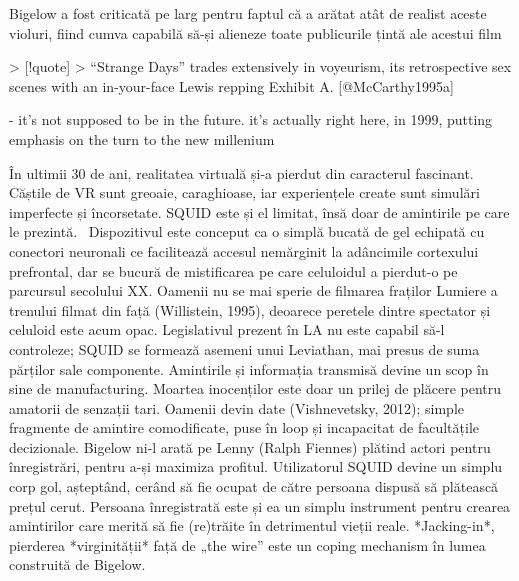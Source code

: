 \documentclass[a4paper, 12pt]{article}
\begin{document}
Bigelow a fost criticată pe larg pentru faptul că a arătat atât de realist aceste violuri, fiind cumva capabilă să-și alieneze toate publicurile țintă ale acestui film

> [!quote]
> “Strange Days” trades extensively in voyeurism, its retrospective sex scenes with an in-your-face Lewis repping Exhibit A. [@McCarthy1995a]



- it's not supposed to be in the future. it's actually right here, in 1999, putting emphasis on the turn to the new millenium

În ultimii 30 de ani, realitatea virtuală și-a pierdut din caracterul fascinant. Căștile de VR sunt greoaie, caraghioase, iar experiențele create sunt simulări imperfecte și încorsetate. SQUID este și el limitat, însă doar de amintirile pe care le prezintă. 
Dispozitivul este conceput ca o simplă bucată de gel echipată cu conectori neuronali ce facilitează accesul nemărginit la adâncimile cortexului prefrontal, dar se bucură de mistificarea pe care celuloidul a pierdut-o pe parcursul secolului XX. Oamenii nu se mai sperie de filmarea fraților Lumiere a trenului filmat din față (Willistein, 1995), deoarece peretele dintre spectator și celuloid este acum opac.
Legislativul prezent în LA nu este capabil să-l controleze; SQUID se formează asemeni unui Leviathan, mai presus de suma părților sale componente.
Amintirile și informația transmisă devine un scop în sine de manufacturing. Moartea inocenților este doar un prilej de plăcere pentru amatorii de senzații tari. Oamenii devin date (Vishnevetsky, 2012); simple fragmente de amintire comodificate, puse în loop și incapacitat de facultățile decizionale. Bigelow ni-l arată pe Lenny (Ralph Fiennes) plătind actori pentru înregistrări, pentru a-și maximiza profitul. Utilizatorul SQUID devine un simplu corp gol, așteptând, cerând să fie ocupat de către persoana dispusă să plătească prețul cerut. Persoana înregistrată este și ea un simplu instrument pentru crearea amintirilor care merită să fie (re)trăite în detrimentul vieții reale.
*Jacking-in*, pierderea *virginității* față de „the wire” este un coping mechanism în lumea construită de Bigelow. 
\end{document}
